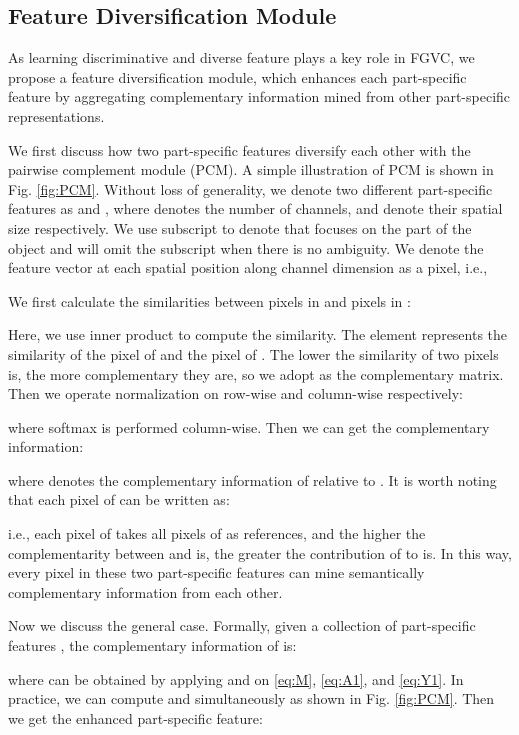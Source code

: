 \documentclass[conference]{IEEEtran}
\begin{document}
	\subsection{Feature Diversification Module}
	As learning discriminative and diverse feature plays a key role in FGVC\cite{MA-CNN}\cite{MAMC}\cite{DB-Net}, we propose a feature diversification module, which enhances each part-specific feature
	by aggregating complementary information mined from other part-specific representations.
	
	We first discuss how two part-specific features diversify each other with the pairwise complement module (PCM). A simple illustration of PCM is shown in Fig. \ref{fig:PCM}.
	Without loss of generality, we denote two different part-specific features as  and , where  denotes the number of channels,  and  denote their spatial size respectively.  We use subscript  to denote that  focuses on the  part of the object and will omit the subscript when there is no ambiguity.
	We denote the feature vector at each spatial position along channel dimension as a pixel, i.e.,
	
	We first calculate the similarities between pixels in  and pixels in :
	
	Here, we use inner product to compute the similarity. The element  represents the similarity of the  pixel of  and the  pixel of . 
	The lower the similarity of two pixels is, the more complementary they are, so we adopt  as the complementary matrix.
	Then we operate normalization on  row-wise and column-wise respectively:
	
	
	where softmax is performed column-wise. Then we can get the complementary information:
	
	
	where  denotes the complementary information of  relative to .
	It is worth noting that each pixel of  can be written as:
	
	i.e., each pixel of  takes all pixels of  as references, and the higher the complementarity between  and  is, the greater the contribution of  to  is.
	In this way, every pixel in these two part-specific features can mine semantically complementary information from each other.
	
	Now we discuss the general case. Formally, given a collection of part-specific features , the complementary information of  is:
	
	where  can be obtained by applying  and  on \eqref{eq:M}, \eqref{eq:A1}, and \eqref{eq:Y1}. In practice, we can compute  and  simultaneously as shown in Fig. \ref{fig:PCM}.
	Then we get the enhanced part-specific feature:
	
\end{document}
